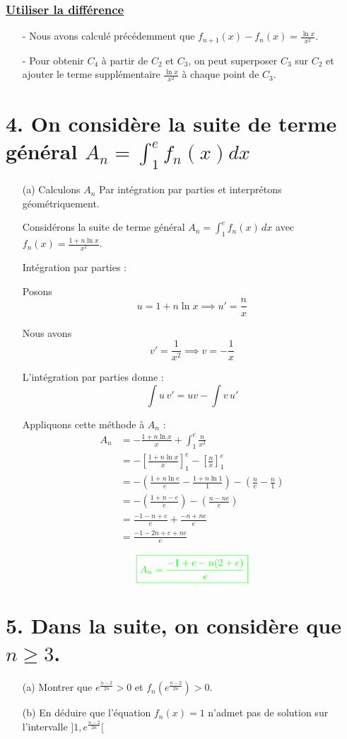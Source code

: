 \documentclass[12pt]{article}
\begin{document}
\begin{enumerate}
\subsubsection*{\underline{ Utiliser la différence }}
\begin{itemize}
    \item[-] Nous avons calculé précédemment que \( f_{n+1}(x) - f_n(x) = \frac{\ln x}{x^2} \).
    \item[-] Pour obtenir \( C_4 \) à partir de \( C_2 \) et \( C_3 \), on peut superposer \( C_3 \) sur \( C_2 \) et ajouter le terme supplémentaire \(\frac{\ln x}{x^2}\) à chaque point de \( C_3 \).
\end{itemize}

\end{enumerate}
\section*{4. On considère la suite de terme général $A_{n}=\int_{1}^{e}f_{n}(x)dx$}
\begin{itemize}
\item[(a)] Calculons $A_{n}$ Par intégration par parties et interprétons géométriquement.

Considérons la suite de terme général \( A_n = \int_{1}^{e} f_n(x) \, dx \) avec \( f_n(x) = \frac{1 + n \ln x}{x^2} \).

Intégration par parties :

Posons 
\[ u = 1 + n \ln x \implies u' = \frac{n}{x} \]

Nous avons 
\[ v' = \frac{1}{x^2} \implies v = -\frac{1}{x} \]

L'intégration par parties donne :
\[ \int u \, v' = uv - \int v \, u' \]

Appliquons cette méthode à \( A_n \) :
\begin{align*}
A_n &=  -\frac{1 + n \ln x}{x}+\int_{1}^{e}\frac{n}{x^{2}}\\
&=-\left[ \frac{1 + n \ln x}{x}\right]_{1}^{e} -\left[ \frac{n}{x}\right] _{1}^{e}\\
&=-\left( \frac{1 + n \ln e}{e}-\frac{1 + n \ln 1}{1}\right) -\left( \frac{n}{e}-\frac{n}{1}\right)\\
&=-\left( \frac{1 + n-e}{e}\right) -\left( \frac{n-ne}{e}\right)\\
&=\frac{-1 - n+e}{e} + \frac{-n+ne}{e}\\
&=\frac{-1 - 2n+e+ne}{e}\\
\end{align*}
\[\textcolor{green}{\boxed{A_n=\frac{-1+e-n(2+e)}{e}}}\]



\end{itemize}
\section*{5. Dans la suite, on considère que $n\geq 3$.}
\begin{itemize}
\item[(a)] Montrer que $ e^{\frac{n-2}{2n}} > 0 $ et $f_{n}(e^{\frac{n-2}{2n}}) > 0$.
\item[(b)] En déduire que l'équation $f_{n}(x)=1$ n'admet pas de solution sur l'intervalle $]1,e^{\frac{n-2}{2n}}[$
\end{itemize}
\end{document}
